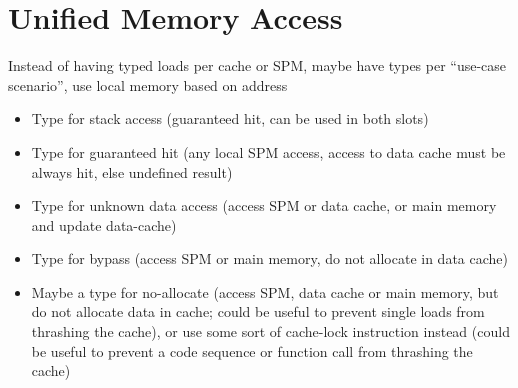 \documentclass[a4paper,fontsize=10pt,twoside,DIV15,BCOR12mm,headinclude=true,footinclude=false,pagesize,bibtotoc]{scrbook}
\newcommand{\comment}[3]{

\textsf{\textbf{#1}} {\color{#3}#2}}
\newcommand{\martin}[1]{\comment{Martin}{#1}{Blue}}
\newcommand{\stefan}[1]{\comment{Stefan}{#1}{RoyalPurple}}
\renewcommand{\martin}[1]{}
\renewcommand{\stefan}[1]{}
\begin{document}
\section{Unified Memory Access}

\stefan{All our memories (except the stack cache) use a unified address space, but due to the typed loads, references must include both address and
type of the cache. Since the type is encoded in the code, any generated code can only use one type of cache or SPM.
If we have a function with $m$ arguments and $n$ different caches or ways of accessing
memory, in the worst case we would need $m^n$ copies of that function to handle all cases (increases instruction cache costs!). We also need to expose this to the programmer,
either through having different names for the functions (very ugly and annoying to use, remember that this is transitive, you need to copy
your whole libraries!), or by having a type system on top of the C types, which means implementing some sort of overloading in C and
auto-generating variants of functions.

Note: we need typed loads to tell the processor which cache (not) to use. We also need a shadow stack not only due to typed loads,
but also due to the write-back policy of the stack cache (would make consistency a night-mare if we would allow to access stack-cache
allocated data over the data cache!).
}
\martin{we discussed that issue in The Vienna mini workshop and should continue to discuss it.}

Instead of having typed loads per cache or SPM, maybe have types per ``use-case scenario'', use local memory based on address
\begin{itemize}
\item Type for stack access (guaranteed hit, can be used in both slots)
\item Type for guaranteed hit (any local SPM access, access to data cache must be always hit, else undefined result)
\item Type for unknown data access (access SPM or data cache, or main memory and update data-cache)
\item Type for bypass (access SPM or main memory, do not allocate in data cache)
\item Maybe a type for no-allocate (access SPM, data cache or main memory, but do not allocate data in cache; could be useful to prevent
single loads from thrashing the cache), or use some sort of cache-lock instruction instead (could be useful to prevent a code sequence or function call from
thrashing the cache)
\end{itemize}
\end{document}
